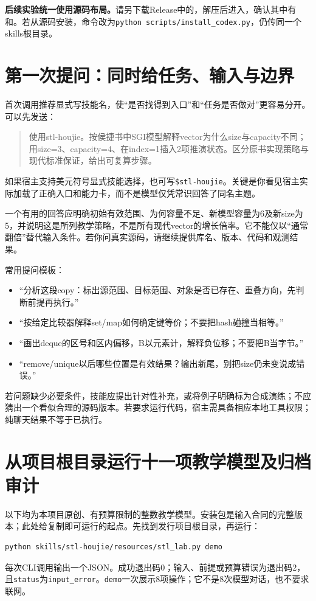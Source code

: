 \documentclass[11pt,a4paper,fontset=fandol]{ctexart}
\begin{document}
\textbf{后续实验统一使用源码布局。}请另下载Release中的，解压后进入，确认其中有和。若从源码安装，命令改为\texttt{python scripts/install\_codex.py}，仍传同一个skills根目录。
\section{第一次提问：同时给任务、输入与边界}
首次调用推荐显式写技能名，使“是否找得到入口”和“任务是否做对”更容易分开。可以先发送：
\begin{quote}
使用stl-houjie。按侯捷书中SGI模型解释vector为什么size与capacity不同；用size=3、capacity=4、在index=1插入2项推演状态。区分原书实现策略与现代标准保证，给出可复算步骤。
\end{quote}
如果宿主支持美元符号显式技能选择，也可写\texttt{\$stl-houjie}。关键是你看见宿主实际加载了正确入口和能力卡，而不是模型仅凭常识回答了同名主题。

一个有用的回答应明确初始有效范围、为何容量不足、新模型容量为6及新size为5，并说明这是所列教学策略，不是所有现代vector的增长倍率。它不能仅以“通常翻倍”替代输入条件。若你问真实源码，请继续提供库名、版本、代码和观测结果。

常用提问模板：
\begin{itemize}
\item “分析这段copy：标出源范围、目标范围、对象是否已存在、重叠方向，先判断前提再执行。”
\item “按给定比较器解释set/map如何确定键等价；不要把hash碰撞当相等。”
\item “画出deque的区号和区内偏移，B以元素计，解释负位移；不要把B当字节。”
\item “remove/unique以后哪些位置是有效结果？输出新尾，别把size仍未变说成错误。”
\end{itemize}
若问题缺少必要条件，技能应提出针对性补充，或将例子明确标为合成演练；不应猜出一个看似合理的源码版本。若要求运行代码，宿主需具备相应本地工具权限；纯聊天结果不等于已执行。
\section{从项目根目录运行十一项教学模型及归档审计}
以下均为本项目原创、有预算限制的整数教学模型。安装包是输入合同的完整版本；此处给复制即可运行的起点。先找到发行项目根目录，再运行：
\begin{lstlisting}
python skills/stl-houjie/resources/stl_lab.py demo
\end{lstlisting}
每次CLI调用输出一个JSON。成功退出码0；输入、前提或预算错误为退出码2，且\texttt{status}为\texttt{input\_error}。\texttt{demo}一次展示8项操作；它不是8次模型对话，也不要求联网。
\end{document}
